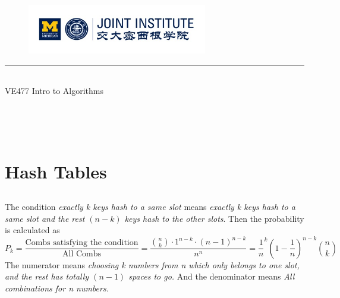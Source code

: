 \documentclass[A4paper]{article}
\begin{document}
\setmainfont{Cormorant Upright}
\renewcommand\arraystretch{1.5}


\thispagestyle{empty}

\begin{center}
\begin{large}
\begin{figure}[!htbp]
\centering
\includegraphics[width=0.7\textwidth]{Logo2.png}
\end{figure}
\hrule
\vspace*{0.25cm}
 \\ 
VE477 Intro to Algorithms\\
\end{large}
\hrulefill

\vspace*{3cm}

\begin{Large}
 \\
\end{Large}
\vspace*{2cm}
\begin{large}
 \\
\end{large}
\end{center}
\newpage
\setmainfont{Optima}
\setmonofont{Optima}
\setsansfont{Optima}
\setcounter{page}{1}
\section{Hash Tables}
\subsection{}
The condition \textit{exactly k keys hash to a same slot} means \textit{exactly k keys hash to a same slot and the rest $(n-k)$ keys hash to the other slots}.
Then the probability is calculated as \[
	P_k = \frac{\text{Combs satisfying the condition}}{\text{All Combs}} = \frac{\binom{n}{k}\cdot 1^{n-k	}\cdot (n-1)^{n-k}}{n^n} = \frac{1}{n}^k \left(1- \frac{1}{n} \right)^{n-k} \binom{n}{k}
\]	
The numerator means \textit{choosing k numbers from n which only belongs to one slot, and the rest has totally $(n-1)$ spaces to go.} And the denominator means \textit{All combinations for n numbers.}
\end{document}
